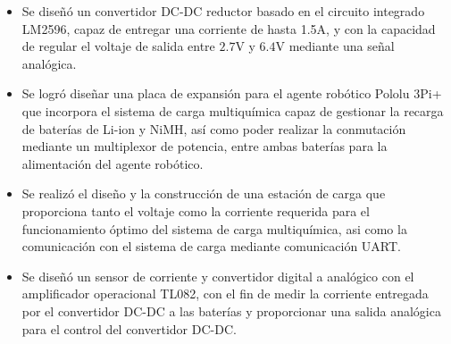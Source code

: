 
\begin{itemize}
    \item Se diseñó un convertidor DC-DC reductor basado en el circuito
    integrado LM2596, capaz de entregar una corriente de hasta 1.5A, y
    con la capacidad de regular el voltaje de salida entre $2.7$V y 
    $6.4$V mediante una señal analógica.


    \item Se logró diseñar una placa de expansión para el agente robótico
    Pololu 3Pi+ que incorpora el sistema de carga multiquímica capaz de
    gestionar la recarga de baterías de Li-ion y NiMH,
    así como poder realizar la conmutación mediante un multiplexor de 
    potencia, entre ambas baterías para la 
    alimentación del agente robótico.

    \item Se realizó el diseño y la construcción de una estación de carga
    que proporciona tanto el voltaje como la corriente requerida para el
    funcionamiento óptimo del sistema de carga multiquímica, asi como la
    comunicación con el sistema de carga mediante comunicación UART.

    \item Se diseñó un sensor de corriente y convertidor digital a 
    analógico con el amplificador operacional TL082, con el fin de
    medir la corriente entregada por el convertidor DC-DC a las baterías y 
    proporcionar una salida analógica para el control del convertidor DC-DC.


\end{itemize}